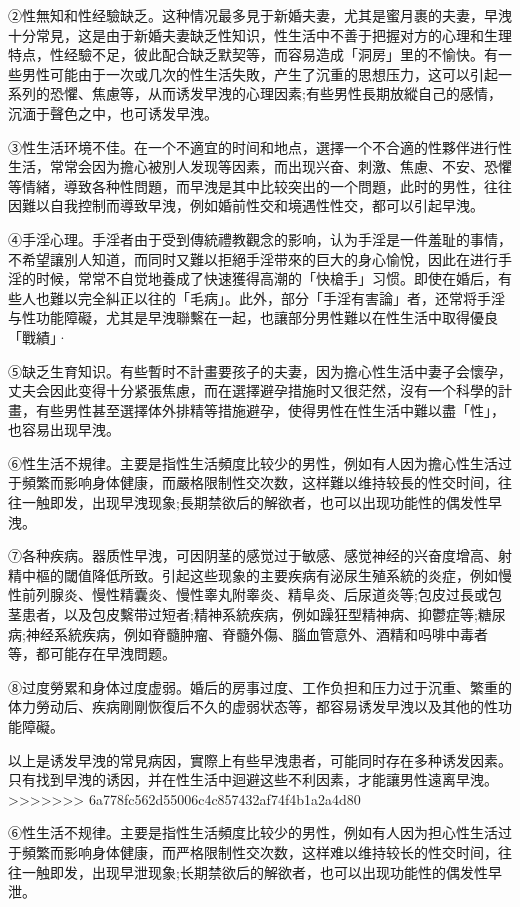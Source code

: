 \documentclass[12pt,UTF8]{ctexbook}
\begin{document}
②性無知和性经驗缺乏。这种情况最多見于新婚夫妻，尤其是蜜月裹的夫妻，早洩十分常見，这是由于新婚夫妻缺乏性知识，性生活中不善于把握对方的心理和生理特点，性经驗不足，彼此配合缺乏默契等，而容易造成「洞房」里的不愉快。有一些男性可能由于一次或几次的性生活失敗，产生了沉重的思想压力，这可以引起一系列的恐懼、焦慮等，从而诱发早洩的心理因素;有些男性長期放縱自己的感情，沉湎于聲色之中，也可诱发早洩。

③性生活环境不佳。在一个不適宜的时间和地点，選擇一个不合適的性夥伴进行性生活，常常会因为擔心被別人发现等因素，而出现兴奋、刺激、焦慮、不安、恐懼等情緒，導致各种性問題，而早洩是其中比较突出的一个問題，此时的男性，往往因難以自我控制而導致早洩，例如婚前性交和境遇性性交，都可以引起早洩。

④手淫心理。手淫者由于受到傳統禮教觀念的影响，认为手淫是一件羞耻的事情，不希望讓別人知道，而同时又難以拒絕手淫带來的巨大的身心愉悅，因此在进行手淫的时候，常常不自觉地養成了快速獲得高潮的「快槍手」习惯。即使在婚后，有些人也難以完全糾正以往的「毛病」。此外，部分「手淫有害論」者，还常将手淫与性功能障礙，尤其是早洩聯繫在一起，也讓部分男性難以在性生活中取得優良「戰績」·

⑤缺乏生育知识。有些暫时不計畫要孩子的夫妻，因为擔心性生活中妻子会懷孕，丈夫会因此变得十分紧張焦慮，而在選擇避孕措施时又很茫然，沒有一个科學的計畫，有些男性甚至選擇体外排精等措施避孕，使得男性在性生活中難以盡「性」，也容易出现早洩。

⑥性生活不規律。主要是指性生活頻度比较少的男性，例如有人因为擔心性生活过于頻繁而影响身体健康，而嚴格限制性交次数，这样難以维持较長的性交时间，往往一触即发，出现早洩现象;長期禁欲后的解欲者，也可以出现功能性的偶发性早洩。

⑦各种疾病。器质性早洩，可因阴茎的感觉过于敏感、感觉神经的兴奋度增高、射精中樞的閾值降低所致。引起这些现象的主要疾病有泌尿生殖系統的炎症，例如慢性前列腺炎、慢性精囊炎、慢性睾丸附睾炎、精阜炎、后尿道炎等;包皮过長或包茎患者，以及包皮繫带过短者;精神系統疾病，例如躁狂型精神病、抑鬱症等;糖尿病;神经系統疾病，例如脊髓肿瘤、脊髓外傷、腦血管意外、酒精和吗啡中毒者等，都可能存在早洩問题。

⑧过度勞累和身体过度虚弱。婚后的房事过度、工作负担和压力过于沉重、繁重的体力勞动后、疾病剛剛恢復后不久的虚弱状态等，都容易诱发早洩以及其他的性功能障礙。

以上是诱发早洩的常見病因，實際上有些早洩患者，可能同时存在多种诱发因素。只有找到早洩的诱因，并在性生活中迴避这些不利因素，才能讓男性遠离早洩。
>>>>>>> 6a778fc562d55006c4c857432af74f4b1a2a4d80

⑥性生活不规律。主要是指性生活頻度比较少的男性，例如有人因为担心性生活过于頻繁而影响身体健康，而严格限制性交次数，这样难以维持较长的性交时间，往往一触即发，出现早泄现象;长期禁欲后的解欲者，也可以出现功能性的偶发性早泄。
\end{document}
